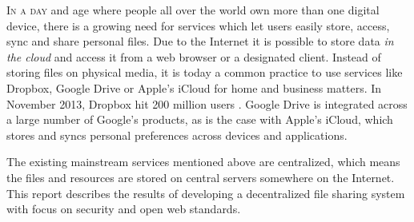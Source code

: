 \lettrine[lines=3]{I}{n a day} and age where people all over the world own more than one digital device, there is a growing need for services which let users easily store, access, sync and share personal files. Due to the Internet it is possible to store data \emph{in the cloud} and access it from a web browser or a designated client. Instead of storing files on physical media, it is today a common practice to use services like Dropbox, Google Drive or Apple's iCloud for home and business matters. In November 2013, Dropbox hit 200 million users \cite{Constine:2013:Online}. Google Drive is integrated across a large number of Google's products, as is the case with Apple's iCloud, which stores and syncs personal preferences across devices and applications.

The existing mainstream services mentioned above are centralized, which means the files and resources are stored on central servers somewhere on the Internet. This report describes the results of developing a decentralized file sharing system with focus on security and open web standards.








